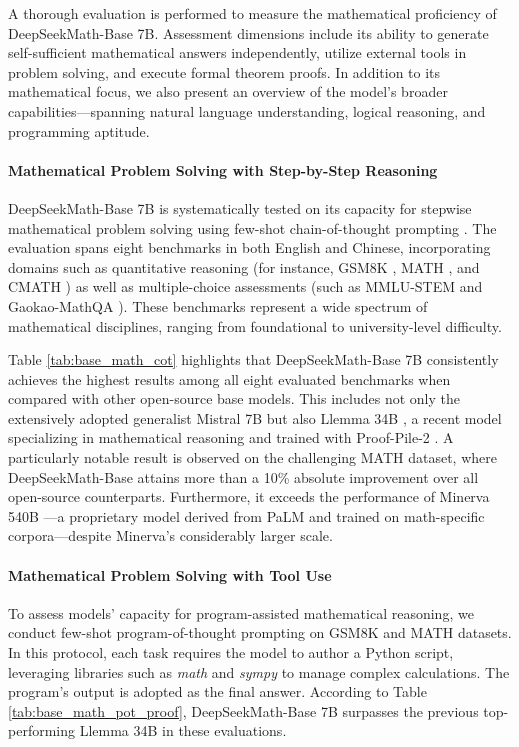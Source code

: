 \begin{itemize}[topsep=0pt]
A thorough evaluation is performed to measure the mathematical proficiency of DeepSeekMath-Base 7B. Assessment dimensions include its ability to generate self-sufficient mathematical answers independently, utilize external tools in problem solving, and execute formal theorem proofs. In addition to its mathematical focus, we also present an overview of the model's broader capabilities—spanning natural language understanding, logical reasoning, and programming aptitude.

\paragraph{Mathematical Problem Solving with Step-by-Step Reasoning}

DeepSeekMath-Base 7B is systematically tested on its capacity for stepwise mathematical problem solving using few-shot chain-of-thought prompting \citep{cot}. The evaluation spans eight benchmarks in both English and Chinese, incorporating domains such as quantitative reasoning (for instance, GSM8K \citep{gsm8k}, MATH \citep{MATH}, and CMATH \citep{wei2023cmath}) as well as multiple-choice assessments (such as MMLU-STEM \citep{mmlu} and Gaokao-MathQA \citep{agieval}). These benchmarks represent a wide spectrum of mathematical disciplines, ranging from foundational to university-level difficulty.

Table \ref{tab:base_math_cot} highlights that DeepSeekMath-Base 7B consistently achieves the highest results among all eight evaluated benchmarks when compared with other open-source base models. This includes not only the extensively adopted generalist Mistral 7B \citep{mistral} but also Llemma 34B \citep{llemma}, a recent model specializing in mathematical reasoning and trained with Proof-Pile-2 \citep{llemma}. A particularly notable result is observed on the challenging MATH dataset, where DeepSeekMath-Base attains more than a 10\% absolute improvement over all open-source counterparts. Furthermore, it exceeds the performance of Minerva 540B \citep{minerva}—a proprietary model derived from PaLM \citep{palm} and trained on math-specific corpora—despite Minerva’s considerably larger scale.

\paragraph{Mathematical Problem Solving with Tool Use} To assess models’ capacity for program-assisted mathematical reasoning, we conduct few-shot program-of-thought prompting \citep{pot,pal} on GSM8K and MATH datasets. In this protocol, each task requires the model to author a Python script, leveraging libraries such as \textit{math} and \textit{sympy} to manage complex calculations. The program’s output is adopted as the final answer. According to Table \ref{tab:base_math_pot_proof}, DeepSeekMath-Base 7B surpasses the previous top-performing Llemma 34B in these evaluations.


\end{itemize}
